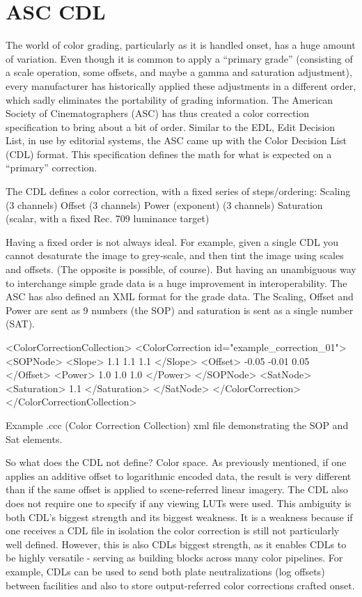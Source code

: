 \section{ASC CDL}%
\label{sec:asc-cdl}

The world of color grading, particularly as it is handled onset, has a huge amount of variation. Even though it is common to apply a “primary grade” (consisting of a scale operation, some offsets, and maybe a gamma and saturation adjustment), every manufacturer has historically applied these adjustments in a different order, which sadly eliminates the portability of grading information. The American Society of Cinematographers (ASC) has thus created a color correction specification to bring about a bit of order. Similar to the EDL, Edit Decision List, in use by editorial systems, the ASC came up with the Color Decision List (CDL) format. This specification defines the math for what is expected on a “primary” correction.

The CDL defines a color correction, with a fixed series of steps/ordering:
 Scaling (3 channels)
 Offset (3 channels)
 Power (exponent) (3 channels)
 Saturation (scalar, with a fixed Rec. 709 luminance target)

Having a fixed order is not always ideal. For example, given a single CDL you cannot desaturate the image to grey-scale, and then tint the image using scales and offsets. (The opposite is possible, of course). But having an unambiguous way to interchange simple grade data is a huge improvement in interoperability. The ASC has also defined an XML format for the grade data. The Scaling, Offset and Power are sent as 9 numbers (the SOP) and saturation is sent as a single number (SAT).

	<ColorCorrectionCollection>
	<ColorCorrection id="example_correction_01">
			<SOPNode>
		<Slope> 1.1 1.1 1.1 </Slope>
		<Offset> -0.05 -0.01 0.05 </Offset>
		<Power> 1.0 1.0 1.0 </Power>
	</SOPNode>
	<SatNode>
		<Saturation> 1.1 </Saturation>
	</SatNode>
</ColorCorrection>
	</ColorCorrectionCollection>

Example .ccc (Color Correction Collection) xml file demonstrating the SOP and Sat elements.

So what does the CDL not define? Color space. As previously mentioned, if one applies an additive offset to logarithmic encoded data, the result is very different than if the same offset is applied to scene-referred linear imagery. The CDL also does not require one to specify if any viewing LUTs were used. This ambiguity is both CDL’s biggest strength and its biggest weakness. It is a weakness because if one receives a CDL file in isolation the color correction is still not particularly well defined. However, this is also CDLs biggest strength, as it enables CDLs to be highly versatile - serving as building blocks across many color pipelines. For example, CDLs can be used to send both plate neutralizations (log offsets) between facilities and also to store output-referred color corrections crafted onset.

